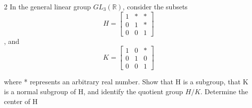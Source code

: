 \documentclass{article}
\newcommand{\R}{\mathbb{R}}
\begin{document}
\begin{PROB}{2}\label{Problem 2.}
    In the general linear group $GL_3(\R)$, consider the subsets $$H = \begin{bmatrix}
        1 & * & * \\ 
        0 & 1 & * \\ 
        0 & 0 & 1
    \end{bmatrix}$$, and $$K = \begin{bmatrix}
        1 & 0 & * \\ 0 & 1 & 0 \\ 0 & 0 & 1
    \end{bmatrix}$$

    where * represents an arbitrary real number. Show that H is a subgroup, that K is a normal subgroup of H, and identify the quotient group $H / K$. Determine the center of H
\end{PROB}
\end{document}

